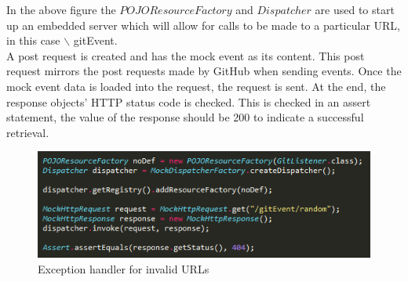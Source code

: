 \documentclass[11pt,a4paper]{article}
\begin{document}
In the above figure the $POJOResourceFactory$ and $Dispatcher$ are used to start up an embedded server which will allow for calls to be made to a particular URL, in this case $\backslash$ gitEvent. \\

A post request is created and has the mock event as its content. This post request mirrors the post requests made by GitHub when sending events. Once the mock event data is loaded into the request, the request is sent. At the end, the response objects' HTTP status code is checked. This is checked in an assert statement, the value of the response should be 200 to indicate a successful retrieval. \\

\begin{figure}[H]
	\begin{center}
		\includegraphics[scale=1.0]{../Images/sample2.png}
		\caption{Exception handler for invalid URLs}
	\end{center}
\end{figure}
\end{document}
